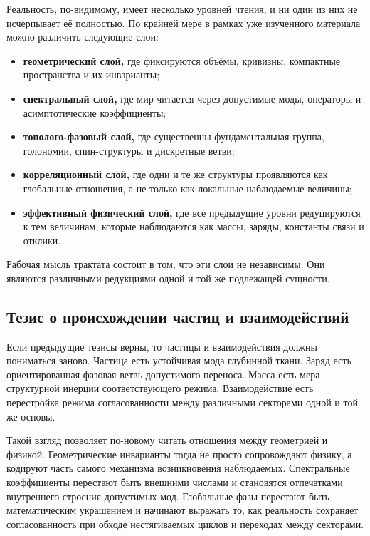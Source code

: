 \documentclass[12pt,a4paper]{article}
\begin{document}
Реальность, по-видимому, имеет несколько уровней чтения, и ни один из них не исчерпывает её полностью. По крайней мере в рамках уже изученного материала можно различить следующие слои:
\begin{itemize}
    \item \textbf{геометрический слой,} где фиксируются объёмы, кривизны, компактные пространства и их инварианты;
    \item \textbf{спектральный слой,} где мир читается через допустимые моды, операторы и асимптотические коэффициенты;
    \item \textbf{тополого-фазовый слой,} где существенны фундаментальная группа, голономии, спин-структуры и дискретные ветви;
    \item \textbf{корреляционный слой,} где одни и те же структуры проявляются как глобальные отношения, а не только как локальные наблюдаемые величины;
    \item \textbf{эффективный физический слой,} где все предыдущие уровни редуцируются к тем величинам, которые наблюдаются как массы, заряды, константы связи и отклики.
\end{itemize}

Рабочая мысль трактата состоит в том, что эти слои не независимы. Они являются различными редукциями одной и той же подлежащей сущности.

\subsection{Тезис о происхождении частиц и взаимодействий}

Если предыдущие тезисы верны, то частицы и взаимодействия должны пониматься заново. Частица есть устойчивая мода глубинной ткани. Заряд есть ориентированная фазовая ветвь допустимого переноса. Масса есть мера структурной инерции соответствующего режима. Взаимодействие есть перестройка режима согласованности между различными секторами одной и той же основы.

Такой взгляд позволяет по-новому читать отношения между геометрией и физикой. Геометрические инварианты тогда не просто сопровождают физику, а кодируют часть самого механизма возникновения наблюдаемых. Спектральные коэффициенты перестают быть внешними числами и становятся отпечатками внутреннего строения допустимых мод. Глобальные фазы перестают быть математическим украшением и начинают выражать то, как реальность сохраняет согласованность при обходе нестягиваемых циклов и переходах между секторами.
\end{document}
